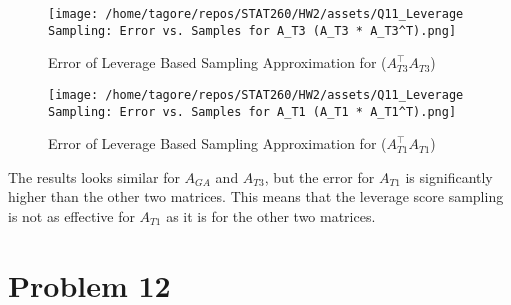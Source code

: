 \documentclass{article}
\begin{document}
\begin{figure}[H]
    \centering
    \texttt{[image: /home/tagore/repos/STAT260/HW2/assets/Q11\_Leverage Sampling: Error vs. Samples for A\_T3 (A\_T3 * A\_T3^T).png]}
    \caption{Error of Leverage Based Sampling Approximation for (\(A_{T3}^\top A_{T3}\))}
    \label{fig:T1_leverage_based_error}
\end{figure}

\begin{figure}[H]
    \centering
    \texttt{[image: /home/tagore/repos/STAT260/HW2/assets/Q11\_Leverage Sampling: Error vs. Samples for A\_T1 (A\_T1 * A\_T1^T).png]}
    \caption{Error of Leverage Based Sampling Approximation for (\(A_{T1}^\top A_{T1}\))}
    \label{fig:T3_leverage_based_error}
\end{figure}

The results looks similar for $A_{GA}$ and $A_{T3}$, but the error for $A_{T1}$ is significantly higher than the other two matrices. 
This means that the leverage score sampling is not as effective for $A_{T1}$ as it is for the other two matrices.


\section*{Problem 12}

\end{document}

